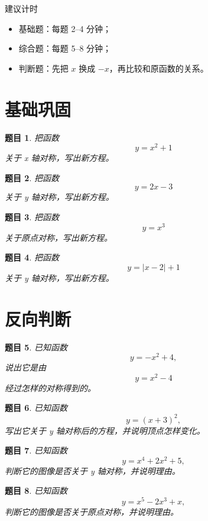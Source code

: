 \documentclass[11pt,a4paper,fontset=fandol]{ctexart}
\theoremstyle{formalexample}
\newtheorem{exercise}{题目}[section]
\begin{document}
\begin{notebox}{建议计时}
\begin{itemize}
  \item 基础题：每题 2--4 分钟；
  \item 综合题：每题 5--8 分钟；
  \item 判断题：先把 $x$ 换成 $-x$，再比较和原函数的关系。
\end{itemize}
\end{notebox}

\section{基础巩固}

\begin{exercise}
把函数
\[
y=x^2+1
\]
关于 x 轴对称，写出新方程。
\end{exercise}

\begin{exercise}
把函数
\[
y=2x-3
\]
关于 y 轴对称，写出新方程。
\end{exercise}

\begin{exercise}
把函数
\[
y=x^3
\]
关于原点对称，写出新方程。
\end{exercise}

\begin{exercise}
把函数
\[
y=|x-2|+1
\]
关于 y 轴对称，写出新方程。
\end{exercise}

\section{反向判断}

\begin{exercise}
已知函数
\[
y=-x^2+4,
\]
说出它是由
\[
y=x^2-4
\]
经过怎样的对称得到的。
\end{exercise}

\begin{exercise}
已知函数
\[
y=(x+3)^2,
\]
写出它关于 y 轴对称后的方程，并说明顶点怎样变化。
\end{exercise}

\begin{exercise}
已知函数
\[
y=x^4+2x^2+5,
\]
判断它的图像是否关于 y 轴对称，并说明理由。
\end{exercise}

\begin{exercise}
已知函数
\[
y=x^5-2x^3+x,
\]
判断它的图像是否关于原点对称，并说明理由。
\end{exercise}
\end{document}
